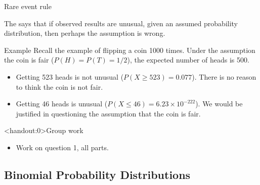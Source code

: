 \documentclass[xcolor=table, handout]{beamer}
\begin{document}
\begin{frame}{Rare event rule}
\begin{block}{}
The  says that if observed results are unusual, given an assumed probability distribution, then perhaps the assumption is wrong.
\end{block}
\pause
\begin{exampleblock}{Example}
Recall the example of flipping a coin 1000 times. Under the assumption the coin is fair ($P(H) = P(T) = 1/2$), the expected number of heads is 500.
\begin{itemize}
\pause\item Getting 523 heads is not unusual ($P(X \ge 523) = 0.077$). There is no reason to think the coin is not fair.
\pause\item Getting 46 heads is unusual ($P(X \le 46) = 6.23 \times 10^{-222}$). We would be justified in questioning the assumption that the coin is fair.
\end{itemize}
\end{exampleblock}
\end{frame}

\begin{frame}<handout:0>{Group work}
\begin{block}{}
\large
\begin{itemize}
\item Work on question 1, all parts.
\end{itemize}
\end{block}
\end{frame}






\subsection{Binomial Probability Distributions}
\end{document}
